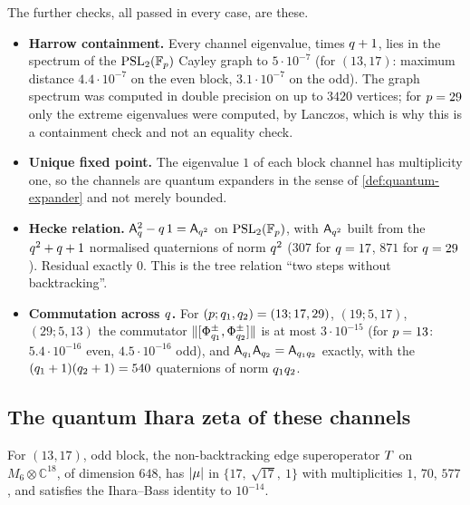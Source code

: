 The further checks, all passed in every case, are these.

\begin{itemize}
  \item \textbf{Harrow containment.} Every channel eigenvalue, times $q+1$,
  lies in the spectrum of the $\mathrm{PSL}_2(\mathbb F_p)$ Cayley graph to $5\cdot10^{-7}$
  (for $(13,17)$: maximum distance $4.4\cdot10^{-7}$ on the even block,
  $3.1\cdot10^{-7}$ on the odd). The graph spectrum was computed in double
  precision on up to $3420$ vertices; for $p=29$ only the extreme
  eigenvalues were computed, by Lanczos, which is why this is a containment
  check and not an equality check.
  \item \textbf{Unique fixed point.} The eigenvalue $1$ of each block channel
  has multiplicity one, so the channels are quantum expanders in the sense of
  \cref{def:quantum-expander} and not merely bounded.
  \item \textbf{Hecke relation.} $\mathsf A_{q}^2 - q\,1 = \mathsf A_{q^2}$ on
  $\mathrm{PSL}_2(\mathbb F_p)$, with $\mathsf A_{q^2}$ built from the $q^2+q+1$ normalised
  quaternions of norm $q^2$ ($307$ for $q=17$, $871$ for $q=29$).
  Residual exactly $0$. This is the tree relation ``two steps without
  backtracking''.
  \item \textbf{Commutation across $q$.} For
  $(p;q_1,q_2) = (13;17,29)$, $(19;5,17)$, $(29;5,13)$ the commutator
  $\lVert[\Phi_{q_1}^{\pm},\Phi_{q_2}^{\pm}]\rVert$ is at most
  $3\cdot10^{-15}$ (for $p=13$: $5.4\cdot10^{-16}$ even,
  $4.5\cdot10^{-16}$ odd), and $\mathsf A_{q_1}\mathsf A_{q_2} =
  \mathsf A_{q_1q_2}$ exactly, with the $(q_1+1)(q_2+1) = 540$ quaternions
  of norm $q_1q_2$.
\end{itemize}

\subsection{The quantum Ihara zeta of these channels}

\begin{numerical}[Edge spectrum and Ihara--Bass for $(\pp,\qs)=(13,17)$]
\label{num:weil-lps-rh}
For $(13,17)$, odd block, the non-backtracking edge superoperator $T$ on
$M_6\otimes\mathbb C^{18}$, of dimension $648$, has $\lvert\mu\rvert$ in
$\{17,\ \sqrt{17},\ 1\}$ with multiplicities $1$, $70$, $577$, and satisfies
the Ihara--Bass identity to $10^{-14}$.
\end{numerical}

